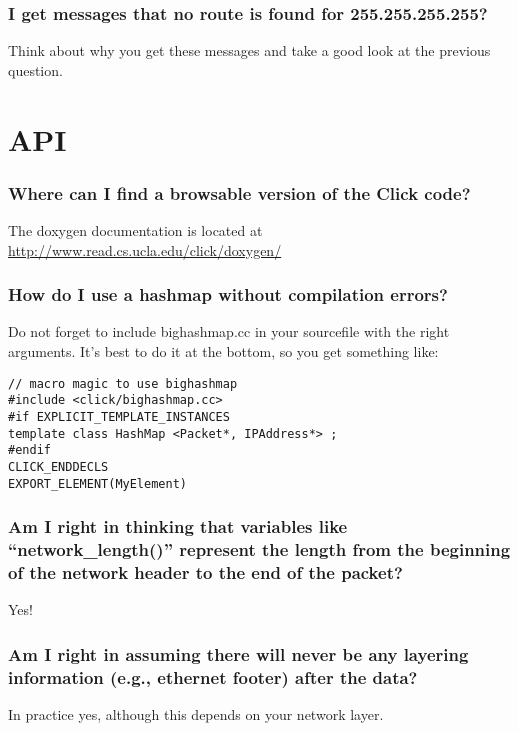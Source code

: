 \documentclass[a4paper]{article}
\begin{document}
\subsubsection*{I get messages that no route is found for 255.255.255.255?}

Think about why you get these messages and take a good look at the
previous question.

\section{API}

\subsubsection*{Where can I find a browsable version of the Click code?}

The doxygen documentation is located at \url{http://www.read.cs.ucla.edu/click/doxygen/}

\subsubsection*{How do I use a hashmap without compilation errors?}

Do not forget to include bighashmap.cc in your sourcefile with the right
arguments. It's best to do it at the bottom, so you get something like:

\begin{lstlisting}
// macro magic to use bighashmap
#include <click/bighashmap.cc>
#if EXPLICIT_TEMPLATE_INSTANCES 
template class HashMap <Packet*, IPAddress*> ;
#endif  
CLICK_ENDDECLS  
EXPORT_ELEMENT(MyElement)
\end{lstlisting}


\subsubsection*{Am I right in thinking that variables like ``network\_length()''
represent the length from the beginning of the network header to the end
of the packet?}

Yes!

\subsubsection*{Am I right in assuming there will never be any layering information
(e.g., ethernet footer) after the data?}

In practice yes, although this depends on your network layer.
\end{document}

